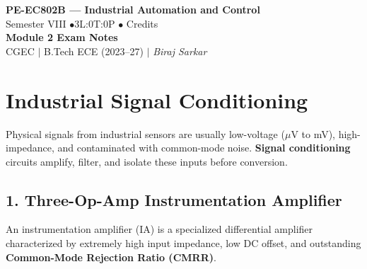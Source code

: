 \documentclass[12pt,a4paper]{article}
\begin{document}

\begin{center}
  {\LARGE\bfseries\color{myred} PE-EC802B --- Industrial Automation and Control}\\[5pt]
  {\normalsize\color{mydark} Semester VIII \quad$\bullet$\quad 3L:0T:0P \quad$\bullet$ Credits}\\[3pt]
  {\normalsize\color{myteal}\textbf{Module 2 Exam Notes}}\\[3pt]
  {\small\color{mydark} CGEC \;$|$\; B.Tech ECE (2023--27) \;$|$\; \textit{Biraj Sarkar}}
\end{center}
\vspace{2pt}
\noindent{\color{myred}\rule{\linewidth}{1.5pt}}
\vspace{2pt}

\hypersetup{linkcolor=mydark}
\tableofcontents
\hypersetup{linkcolor=myteal}
\newpage

\section{Industrial Signal Conditioning}

Physical signals from industrial sensors are usually low-voltage ($\mu$V to mV), high-impedance, and contaminated with common-mode noise. \textbf{Signal conditioning} circuits amplify, filter, and isolate these inputs before conversion.

\subsection{1. Three-Op-Amp Instrumentation Amplifier}
An instrumentation amplifier (IA) is a specialized differential amplifier characterized by extremely high input impedance, low DC offset, and outstanding \textbf{Common-Mode Rejection Ratio (CMRR)}.
\end{document}
